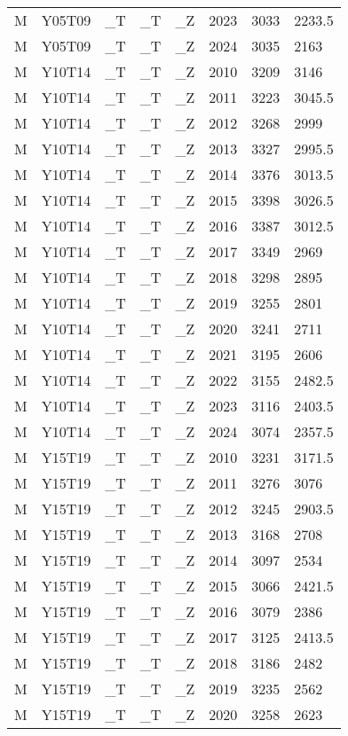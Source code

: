 \begin{longtable}[t]{llllllll}
M & Y05T09 & \_T & \_T & \_Z & 2023 & 3033 & 2233.5\\
M & Y05T09 & \_T & \_T & \_Z & 2024 & 3035 & 2163\\
\addlinespace
M & Y10T14 & \_T & \_T & \_Z & 2010 & 3209 & 3146\\
M & Y10T14 & \_T & \_T & \_Z & 2011 & 3223 & 3045.5\\
M & Y10T14 & \_T & \_T & \_Z & 2012 & 3268 & 2999\\
M & Y10T14 & \_T & \_T & \_Z & 2013 & 3327 & 2995.5\\
M & Y10T14 & \_T & \_T & \_Z & 2014 & 3376 & 3013.5\\
\addlinespace
M & Y10T14 & \_T & \_T & \_Z & 2015 & 3398 & 3026.5\\
M & Y10T14 & \_T & \_T & \_Z & 2016 & 3387 & 3012.5\\
M & Y10T14 & \_T & \_T & \_Z & 2017 & 3349 & 2969\\
M & Y10T14 & \_T & \_T & \_Z & 2018 & 3298 & 2895\\
M & Y10T14 & \_T & \_T & \_Z & 2019 & 3255 & 2801\\
\addlinespace
M & Y10T14 & \_T & \_T & \_Z & 2020 & 3241 & 2711\\
M & Y10T14 & \_T & \_T & \_Z & 2021 & 3195 & 2606\\
M & Y10T14 & \_T & \_T & \_Z & 2022 & 3155 & 2482.5\\
M & Y10T14 & \_T & \_T & \_Z & 2023 & 3116 & 2403.5\\
M & Y10T14 & \_T & \_T & \_Z & 2024 & 3074 & 2357.5\\
\addlinespace
M & Y15T19 & \_T & \_T & \_Z & 2010 & 3231 & 3171.5\\
M & Y15T19 & \_T & \_T & \_Z & 2011 & 3276 & 3076\\
M & Y15T19 & \_T & \_T & \_Z & 2012 & 3245 & 2903.5\\
M & Y15T19 & \_T & \_T & \_Z & 2013 & 3168 & 2708\\
M & Y15T19 & \_T & \_T & \_Z & 2014 & 3097 & 2534\\
\addlinespace
M & Y15T19 & \_T & \_T & \_Z & 2015 & 3066 & 2421.5\\
M & Y15T19 & \_T & \_T & \_Z & 2016 & 3079 & 2386\\
M & Y15T19 & \_T & \_T & \_Z & 2017 & 3125 & 2413.5\\
M & Y15T19 & \_T & \_T & \_Z & 2018 & 3186 & 2482\\
M & Y15T19 & \_T & \_T & \_Z & 2019 & 3235 & 2562\\
\addlinespace
M & Y15T19 & \_T & \_T & \_Z & 2020 & 3258 & 2623\\

\end{longtable}
